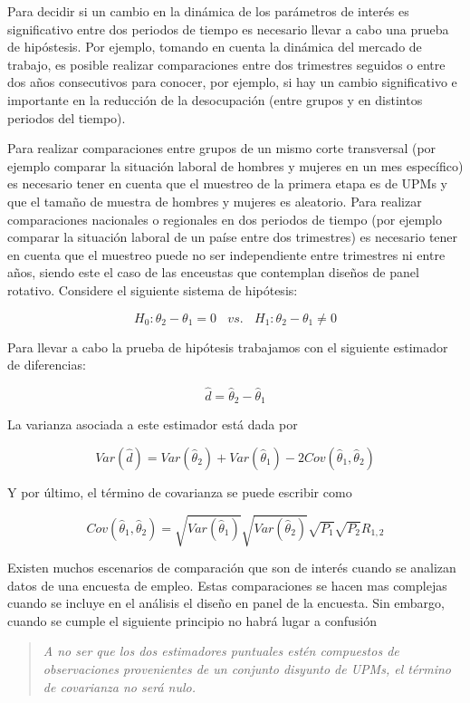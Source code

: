 \documentclass[12pt,spanish,]{book}
\begin{document}
Para decidir si un cambio en la dinámica de los parámetros de interés es significativo entre dos periodos de tiempo es necesario llevar a cabo una prueba de hipóstesis. Por ejemplo, tomando en cuenta la dinámica del mercado de trabajo, es posible realizar comparaciones entre dos trimestres seguidos o entre dos años consecutivos para conocer, por ejemplo, si hay un cambio significativo e importante en la reducción de la desocupación (entre grupos y en distintos periodos del tiempo).

Para realizar comparaciones entre grupos de un mismo corte transversal (por ejemplo comparar la situación laboral de hombres y mujeres en un mes específico) es necesario tener en cuenta que el muestreo de la primera etapa es de UPMs y que el tamaño de muestra de hombres y mujeres es aleatorio. Para realizar comparaciones nacionales o regionales en dos periodos de tiempo (por ejemplo comparar la situación laboral de un paíse entre dos trimestres) es necesario tener en cuenta que el muestreo puede no ser independiente entre trimestres ni entre años, siendo este el caso de las enceustas que contemplan diseños de panel rotativo. Considere el siguiente sistema de hipótesis:

\[
H_0: \theta_2 - \theta_1 = 0 \ \ \ \ vs. \ \ \ \ H_1: \theta_2 - \theta_1 \neq 0
\]

Para llevar a cabo la prueba de hipótesis trabajamos con el siguiente estimador de diferencias:

\[
\hat{d} = \hat{\theta}_2 - \hat{\theta}_1
\]

La varianza asociada a este estimador está dada por

\[
Var(\hat{d}) 
= Var(\hat{\theta}_2) + Var(\hat{\theta}_1) - 2 Cov(\hat{\theta}_1, \hat{\theta}_2) 
\]

Y por último, el término de covarianza se puede escribir como

\[
Cov(\hat{\theta}_1, \hat{\theta}_2) = \sqrt{Var(\hat{\theta}_1)}\sqrt{Var(\hat{\theta}_2)}\sqrt{P_1}\sqrt{P_2}R_{1,2}
\]

Existen muchos escenarios de comparación que son de interés cuando se analizan datos de una encuesta de empleo. Estas comparaciones se hacen mas complejas cuando se incluye en el análisis el diseño en panel de la encuesta. Sin embargo, cuando se cumple el siguiente principio no habrá lugar a confusión

\begin{quote}
\emph{A no ser que los dos estimadores puntuales estén compuestos de observaciones provenientes de un conjunto disyunto de UPMs, el término de covarianza no será nulo.}
\end{quote}
\end{document}
